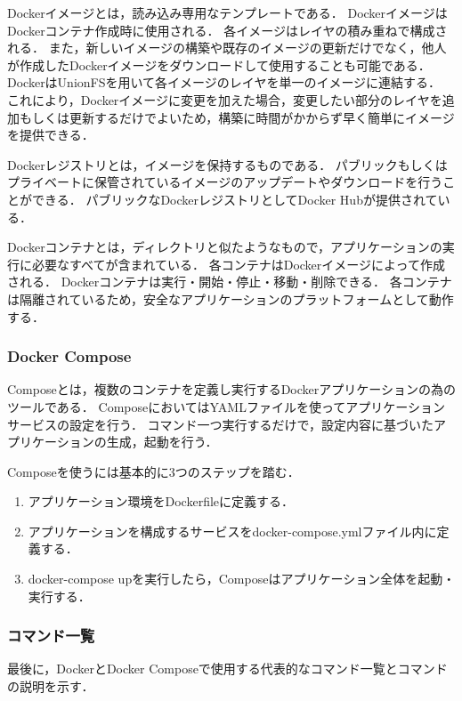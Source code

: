 Dockerイメージとは，読み込み専用なテンプレートである．
DockerイメージはDockerコンテナ作成時に使用される．
各イメージはレイヤの積み重ねで構成される．
また，新しいイメージの構築や既存のイメージの更新だけでなく，他人が作成したDockerイメージをダウンロードして使用することも可能である．
DockerはUnionFS\cite{Unionfs}を用いて各イメージのレイヤを単一のイメージに連結する．
これにより，Dockerイメージに変更を加えた場合，変更したい部分のレイヤを追加もしくは更新するだけでよいため，構築に時間がかからず早く簡単にイメージを提供できる．

Dockerレジストリとは，イメージを保持するものである．
パブリックもしくはプライベートに保管されているイメージのアップデートやダウンロードを行うことができる．
パブリックなDockerレジストリとしてDocker Hub\cite{dockerhub}が提供されている．

Dockerコンテナとは，ディレクトリと似たようなもので，アプリケーションの実行に必要なすべてが含まれている．
各コンテナはDockerイメージによって作成される．
Dockerコンテナは実行・開始・停止・移動・削除できる．
各コンテナは隔離されているため，安全なアプリケーションのプラットフォームとして動作する．


\subsubsection{Docker Compose}
Composeとは，複数のコンテナを定義し実行するDockerアプリケーションの為のツールである．
ComposeにおいてはYAML\cite{YAML}ファイルを使ってアプリケーションサービスの設定を行う．
コマンド一つ実行するだけで，設定内容に基づいたアプリケーションの生成，起動を行う．

Composeを使うには基本的に3つのステップを踏む．

\begin{enumerate}
    \item アプリケーション環境をDockerfileに定義する．
    \item アプリケーションを構成するサービスをdocker-compose.ymlファイル内に定義する．
    \item docker-compose upを実行したら，Composeはアプリケーション全体を起動・実行する．
\end{enumerate}

\newpage
\subsubsection{コマンド一覧}
最後に，DockerとDocker Composeで使用する代表的なコマンド一覧とコマンドの説明を示す．


